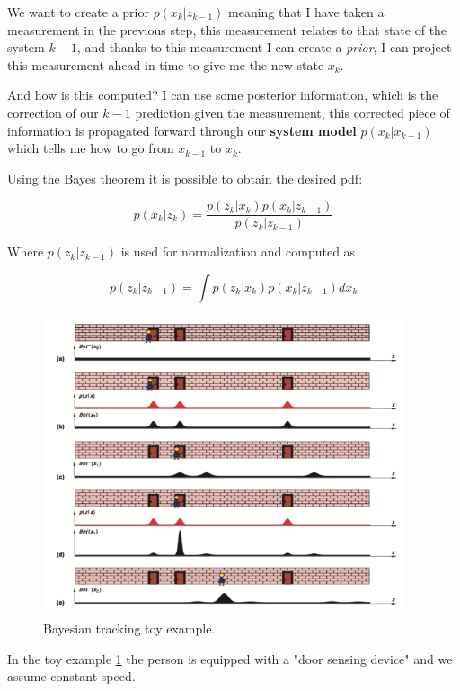We want to create a prior $p(x_k|z_{k-1})$ meaning that I have taken a measurement in the previous step, this measurement relates to that state of the system $k-1$, and thanks to this measurement I can create a \textit{prior}, I can project this measurement ahead in time to give me the new state $x_k$.

And how is this computed? I can use some posterior information, which is the correction of our $k-1$ prediction given the measurement, this corrected piece of information is propagated forward through our \textbf{system model} $p(x_k|x_{k-1})$ which tells me how to go from $x_{k-1}$ to $x_k$. 

Using the Bayes theorem it is possible to obtain the desired pdf:

\[
    p(x_k|z_k) = \frac{p(z_k|x_k)p(x_k|z_{k-1})}{p(z_k|z_{k-1})}
\]

Where $p(z_k|z_{k-1})$ is used for normalization and computed as

\[
    p(z_k|z_{k-1}) = \int p(z_k|x_k)p(x_k|z_{k-1})dx_k
\]

\begin{figure}[H]
    \centering
    \includegraphics[width=0.95\textwidth]{Figures/bayes.png}
    \caption{Bayesian tracking toy example.}
    \label{img:bayes}
\end{figure}

In the toy example \ref{img:bayes} the person is equipped with a "door sensing device" and we assume constant speed. 


